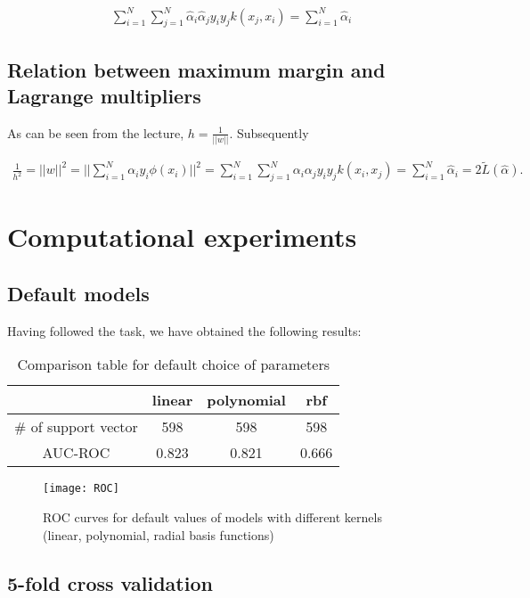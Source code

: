 \documentclass{article}
\begin{document}
\begin{align}
\boxed{\sum\limits_{i=1}^N \sum\limits_{j=1}^N \hat{\alpha}_i \hat{\alpha}_j y_i y_j k(x_j, x_i) = \sum\limits_{i=1}^N \hat{\alpha}_i}
\end{align}

\subsection{Relation between maximum margin and Lagrange multipliers}

As can be seen from the lecture, $h = \frac{1}{||w||}$. Subsequently

\begin{align*}
\frac1{h^2} = ||w||^2 = ||\sum\limits_{i=1}^N \alpha_i y_i \phi(x_i) ||^2 = \sum\limits_{i=1}^N  \sum\limits_{j=1}^N \alpha_i \alpha_j y_i y_j k(x_i, x_j) =  \sum\limits_{i=1}^N \hat{\alpha}_i = 2 \widetilde{L}(\hat{\alpha}).
\end{align*}

\section{Computational experiments}

\subsection{Default models}

Having followed the task, we have obtained the following results:

\begin{table}[h!]
\centering
\begin{tabular}{|c|c|c|c|}
\hline
 & linear & polynomial & rbf \\
\hline
\# of support vector & 598 & 598 & 598 \\
\hline
AUC-ROC & 0.823 & 0.821 & 0.666 \\
\hline	
\end{tabular}
\caption{Comparison table for default choice of parameters}
\end{table}

\begin{figure*}[h!]
\texttt{[image: ROC]}
\caption{ROC curves for default values of models with different kernels (linear, polynomial, radial basis functions)}
\end{figure*}

\subsection{5-fold cross validation}
\end{document}
